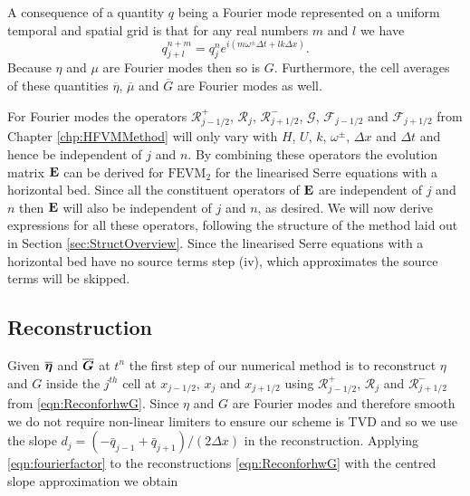 A consequence of a quantity $q$ being a Fourier mode represented on a uniform temporal and spatial grid is that for any real numbers $m$ and $l$ we have
\begin{equation}
q^{n + m}_{j + l} = q^n_j e^{ i \left(m \omega^\pm \Delta t + l k \Delta x\right)}.
\label{eqn:fourierfactor}
\end{equation}
Because $\eta$ and $\mu$ are Fourier modes then so is $G$. Furthermore, the cell averages of these quantities $\overline{\eta}$, $\overline{\mu}$ and $\overline{G}$ are Fourier modes as well.

For Fourier modes the operators $\mathcal{R}^+_{j-1/2}$, $\mathcal{R}_{j}$, $\mathcal{R}^-_{j+1/2}$, $\mathcal{G}$, $\mathcal{F}_{j-1/2}$ and $\mathcal{F}_{j+1/2}$ from Chapter \ref{chp:HFVMMethod} will only vary with $H$, $U$, $k$, $\omega^\pm$, $\Delta x$ and $\Delta t$ and hence be independent of $j$ and $n$. By combining these operators the evolution matrix $\mathbf{E}$ can be derived for $\text{FEVM}_2$ for the linearised Serre equations with a horizontal bed. Since all the constituent operators of $\mathbf{E}$ are independent of $j$ and $n$ then $\mathbf{E}$ will also be independent of $j$ and $n$, as desired. We will now derive expressions for all these operators, following the structure of the method laid out in Section \ref{sec:StructOverview}. Since the linearised Serre equations with a horizontal bed have no source terms step (iv), which approximates the source terms will be skipped.   

\subsection{Reconstruction}
Given $\overline{\boldsymbol{\eta}}$ and $\overline{\boldsymbol{G}}$ at $t^n$ the first step of our numerical method is to reconstruct $\eta$ and $G$ inside the $j^{th}$ cell at $x_{j-1/2}$, $x_j$ and $x_{j+1/2}$ using $\mathcal{R}^+_{j-1/2}$, $\mathcal{R}_{j}$ and $\mathcal{R}^-_{j+1/2}$ from \eqref{eqn:ReconforhwG}. Since $\eta$ and $G$ are Fourier modes and therefore smooth we do not require non-linear limiters to ensure our scheme is TVD and so we use the slope $d_j = \left({-\bar{q}_{j-1} +\bar{q}_{j+1}}\right)/ \left({2\Delta x} \right)$ in the reconstruction. Applying \eqref{eqn:fourierfactor} to the reconstructions \eqref{eqn:ReconforhwG} with the centred slope approximation we obtain 

